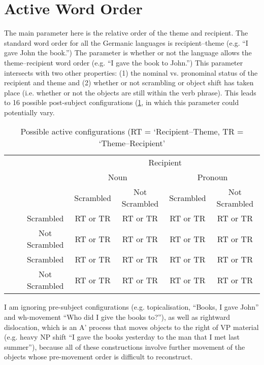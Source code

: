 \section{Active Word Order}\label{sec:actwo}
The main parameter here is the relative order of the theme and recipient. The standard word order for all the Germanic languages is recipient--theme (e.g. ``I gave John the book.'') The parameter is whether or not the language allows the theme--recipient word order (e.g. ``I gave the book to John.'') This parameter intersects with two other properties: (1) the nominal vs. pronominal status of the recipient and theme and (2) whether or not scrambling or object shift has taken place (i.e. whether or not the objects are still within the verb phrase). This leads to 16 possible post-subject configurations (\ref{tab:activeorders}, in which this parameter could potentially vary.

\begin{table}[h!]
\begin{tabular}{ccccccc}
&&& \multicolumn{4}{c}{Recipient}\\
&&& \multicolumn{2}{c}{Noun} & \multicolumn{2}{c}{Pronoun}\\
&&& Scrambled & Not Scrambled & Scrambled & Not Scrambled\\
{\multirow{4}{*}{Theme}}&{\multirow{2}{*}{Noun}}&Scrambled&RT or TR&RT or TR&RT or TR&RT or TR\\
&&Not Scrambled&RT or TR&RT or TR&RT or TR&RT or TR\\
&{\multirow{2}{*}{Pronoun}}&Scrambled&RT or TR&RT or TR&RT or TR&RT or TR\\
&&Not Scrambled&RT or TR&RT or TR&RT or TR&RT or TR\\
\end{tabular}
\caption{Possible active configurations (RT = `Recipient--Theme, TR = `Theme--Recipient'}
\label{tab:activeorders}
\end{table}

 I am ignoring pre-subject configurations (e.g. topicalisation, ``Books, I gave John'' and wh-movement ``Who did I give the books to?''), as well as rightward dislocation, which is an A' process that moves objects to the right of VP material (e.g. heavy NP shift ``I gave the books yesterday to the man that I met last summer''), because all of these constructions involve further movement of the objects whose pre-movement order is difficult to reconstruct.

